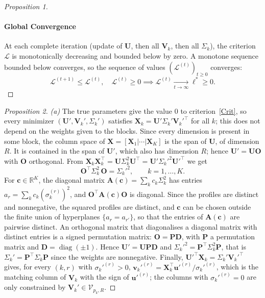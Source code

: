 \documentclass[11pt]{article}
\DeclareMathOperator{\diag}{diag}
\newcommand{\X}{\mathbf{X}}
\newcommand{\U}{\mathbf{U}}
\newcommand{\V}{\mathbf{V}}
\newcommand{\uu}{\mathbf{u}}
\newcommand{\vv}{\mathbf{v}}
\newcommand{\Stiefel}[2]{\mathcal V_{#1,#2}}
\begin{document}
\begin{proof}[Proposition 1]
\paragraph{Global Convergence} At each complete iteration (update of $\U$, then all $\V_k$, then all $\Sigma_k$), the criterion $\mathcal{L}$ is monotonically decreasing and bounded below by zero. A monotone sequence bounded below converges, so the sequence of values $(\mathcal{L}^{(t)})_{t \geq 0}$
converges:
\[
  \mathcal{L}^{(t+1)} \leq \mathcal{L}^{(t)}, \quad \mathcal{L}^{(t)} \geq 0
  \implies
  \mathcal{L}^{(t)} \xrightarrow[t \to \infty]{} \ell^* \geq 0.
\]
\end{proof}

\begin{proof}[Proposition 2]
\emph{(a)} The true parameters give the value $0$ to criterion~\eqref{Crit}, so
every minimizer $(\U',\V_k',\Sigma_k')$ satisfies
$\X_k=\U'\Sigma_k'\V_k'^\intercal$ for all $k$; this does not depend on the
weights given to the blocks. Since every dimension is present in some block,
the column space of $\X=[\X_1|\cdots|\X_K]$ is the span of $\U$, of dimension
$R$. It is contained in the span of $\U'$, which also has dimension $R$; hence
$\U'=\U\mathbf O$ with $\mathbf O$ orthogonal. From
$\X_k\X_k^\intercal=\U\Sigma_k^2\U^\intercal=\U'\Sigma_k'^2\U'^\intercal$ we get
\[
  \mathbf O^\intercal\Sigma_k^2\,\mathbf O=\Sigma_k'^2,\qquad k=1,\ldots,K .
\]
For $\mathbf c\in\mathbb R^K$, the diagonal matrix
$\mathbf A(\mathbf c)=\sum_k c_k\Sigma_k^2$ has entries
$a_r=\sum_k c_k(\sigma_k^{(r)})^2$, and $\mathbf O^\intercal\mathbf A(\mathbf c)\mathbf O$
is diagonal. Since the profiles are distinct and nonnegative, the squared
profiles are distinct, and $\mathbf c$ can be chosen outside the finite union
of hyperplanes $\{a_r=a_{r'}\}$, so that the entries of $\mathbf A(\mathbf c)$
are pairwise distinct. An orthogonal matrix that diagonalises a diagonal
matrix with distinct entries is a signed permutation matrix:
$\mathbf O=\mathbf P\mathbf D$, with $\mathbf P$ a permutation matrix and
$\mathbf D=\diag(\pm1)$. Hence $\U'=\U\mathbf P\mathbf D$ and
$\Sigma_k'^2=\mathbf P^\intercal\Sigma_k^2\mathbf P$, that is
$\Sigma_k'=\mathbf P^\intercal\Sigma_k\mathbf P$ since the weights are
nonnegative. Finally, $\U'^\intercal\X_k=\Sigma_k'\V_k'^\intercal$ gives, for
every $(k,r)$ with $\sigma_k'^{(r)}>0$,
$\vv_k'^{(r)}=\X_k^\intercal\uu'^{(r)}/\sigma_k'^{(r)}$, which is the matching
column of $\V_k$ with the sign of $\uu'^{(r)}$; the columns with
$\sigma_k'^{(r)}=0$ are only constrained by $\V_k'\in\Stiefel{p_k}{R}$.


\end{proof}
\end{document}
